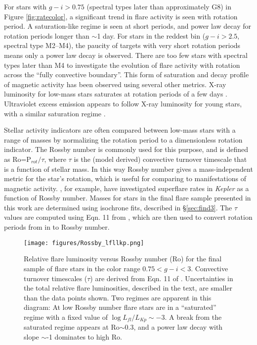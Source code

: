 \documentclass[twocolumn]{aastex6}
\newcommand{\Kepler}{\textsl{Kepler}\xspace}
\begin{document}
For stars with $g-i>0.75$ (spectral types later than approximately G8) in Figure \ref{fig:ratecolor}, a significant trend in flare activity is seen with rotation period. A saturation-like regime is seen at short periods, and power law decay for rotation periods longer than $\sim$1 day. For stars in the reddest bin ($g-i>2.5$, spectral type M2--M4), the paucity of targets with very short rotation periods means only a power law decay is observed. There are too few stars with spectral types later than M4 to investigate the evolution of flare activity with rotation across the ``fully convective boundary''. This form of saturation and decay profile of magnetic activity has been observed using several other metrics. X-ray luminosity for low-mass stars  saturates at rotation periods of a few days \citep{pizzolato2003,wright2011}. Ultraviolet excess emission appears to follow X-ray luminosity for young stars, with a similar saturation regime \citep{shkolnik2014}.




Stellar activity indicators are often compared between low-mass stars with a range of masses by normalizing the rotation period to a dimensionless rotation indicator. The Rossby number is commonly used for this purpose, and is defined as Ro=P$_{rot}/\tau$, where $\tau$ is the (model derived) convective turnover timescale that is a function of stellar mass.  In this way Rossby number gives a mass-independent metric for the star's rotation, which is useful for comparing to manifestations of magnetic activity. \citet{candelaresi2014}, for example, have investigated superflare rates in \Kepler as a function of Rossby number. Masses for stars in the final flare sample presented in this work are determined using isochrone fits, described in \S\ref{sec:find3}. The $\tau$ values are computed using Eqn. 11 from \citet{wright2011}, which are then used to convert rotation periods from \citet{mcquillan2014} in to Rossby number.



\begin{figure*}[!t]
\centering
\texttt{[image: figures/Rossby\_lfllkp.png]}
\caption{Relative flare luminosity versus Rossby number (Ro) for the final sample of flare stars in the color range $0.75 < g-i < 3$. Convective turnover timescales ($\tau$) are derived from Eqn. 11 of \citet{wright2011}. Uncertainties in the total relative flare luminosities, described in the text, are smaller than the data points shown.
Two regimes are apparent in this diagram: At low Rossby number flare stars are in a ``saturated'' regime with a fixed value of $\log L_{fl}/L_{Kp} \sim -3$. A break from the saturated regime appears at Ro$\sim$0.3, and a power law decay with slope $\sim$-1 dominates to high Ro.
}
\label{fig:rossby}
\end{figure*}
\end{document}
